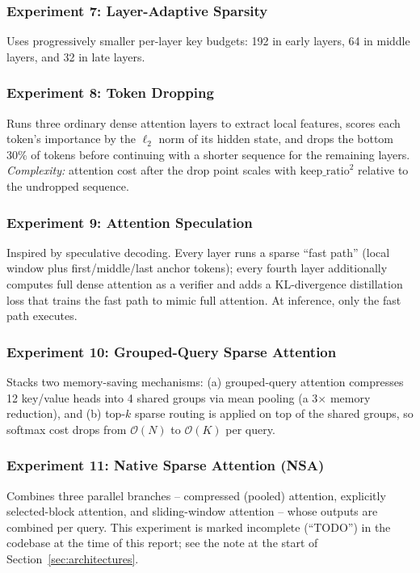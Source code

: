 \documentclass[11pt]{article}
\newcommand{\bigO}{\mathcal{O}}
\begin{document}
\subsubsection*{Experiment 7: Layer-Adaptive Sparsity}
\label{exp:layer-adaptive}
Uses progressively smaller per-layer key budgets: 192 in early layers, 64 in
middle layers, and 32 in late layers.

\subsubsection*{Experiment 8: Token Dropping}
\label{exp:token-drop}
Runs three ordinary dense attention layers to extract local features, scores
each token's importance by the $\ell_2$ norm of its hidden state, and drops
the bottom 30\% of tokens before continuing with a shorter sequence for the
remaining layers. \emph{Complexity:} attention cost after the drop point
scales with $\mathrm{keep\_ratio}^2$ relative to the undropped sequence.

\subsubsection*{Experiment 9: Attention Speculation}
\label{exp:speculation}
Inspired by speculative decoding. Every layer runs a sparse ``fast path''
(local window plus first/middle/last anchor tokens); every fourth layer
additionally computes full dense attention as a verifier and adds a
KL-divergence distillation loss that trains the fast path to mimic full
attention. At inference, only the fast path executes.

\subsubsection*{Experiment 10: Grouped-Query Sparse Attention}
\label{exp:gqa}
Stacks two memory-saving mechanisms: (a) grouped-query attention compresses
12 key/value heads into 4 shared groups via mean pooling (a 3$\times$ memory
reduction), and (b) top-$k$ sparse routing is applied on top of the shared
groups, so softmax cost drops from $\bigO(N)$ to $\bigO(K)$ per query.

\subsubsection*{Experiment 11: Native Sparse Attention (NSA)}
\label{exp:nsa}
Combines three parallel branches -- compressed (pooled) attention, explicitly
selected-block attention, and sliding-window attention -- whose outputs are
combined per query. This experiment is marked incomplete (``TODO'') in the
codebase at the time of this report; see the note at the start of
Section~\ref{sec:architectures}.
\end{document}
